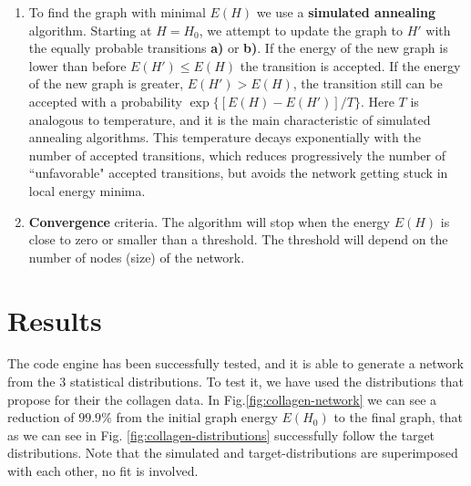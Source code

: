 \begin{enumerate}[label=\textbf{\Roman*}]
  \item To find the graph with minimal $E(H)$ we use a \textbf{simulated
  annealing} algorithm. Starting at $H=H_0$, we attempt to update the graph to
  $H'$ with the equally probable transitions \textbf{a)} or \textbf{b)}.  If the
  energy of the new graph is lower than before $E(H')\leq E(H)$ the transition
  is accepted. If the energy of the new graph is greater, $E(H')> E(H)$, the
  transition still can be accepted with a probability $\exp\{[E(H)-E(H')]/T\}$.
  Here $T$ is  analogous to temperature, and it is the main characteristic of
  simulated annealing algorithms. This temperature decays exponentially with the number of accepted transitions, which reduces
  progressively the number of ``unfavorable" accepted transitions, but avoids
  the network getting stuck in local energy minima.
  \item \textbf{Convergence} criteria. The algorithm will stop when the energy
  $E(H)$ is close to zero or smaller than a threshold.
  The threshold will depend on the number of nodes (size) of the network.
\end{enumerate}

\section{Results}
The code engine has been successfully tested, and it is able to
generate a network from the $3$ statistical distributions. To test it, we have
used the distributions that \citet{lindstrom_biopolymer_2010} propose for their
the collagen data. In Fig.\ref{fig:collagen-network} we
can see a reduction of $99.9\%$ from the initial graph energy $E(H_0)$ to the
final graph, that as we can see in Fig.
\ref{fig:collagen-distributions} successfully follow the target distributions.
Note that the
simulated and target-distributions are superimposed with each other, no fit is involved.

